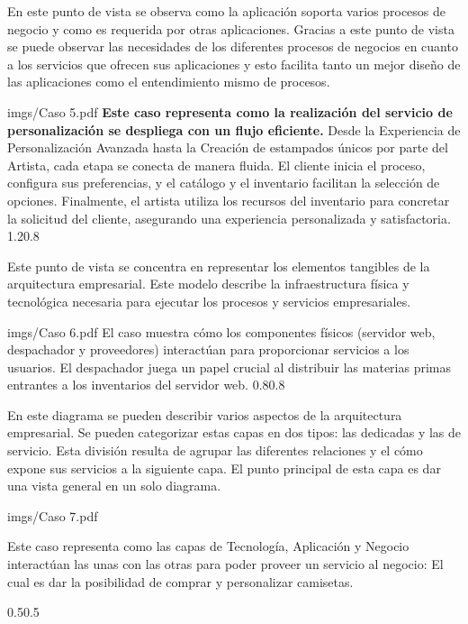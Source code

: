 {
 En este punto de vista se observa como la aplicación soporta varios procesos de negocio y como es requerida por otras aplicaciones. Gracias a este punto de vista se puede
observar las necesidades de los diferentes procesos de negocios en cuanto a los servicios que ofrecen sus aplicaciones y esto facilita tanto un mejor diseño de las aplicaciones como
el entendimiento mismo de procesos.\cite{definicion_capas}

}
{imgs/Caso 5.pdf}
{
   \textbf{Este caso representa como la realización del servicio de  personalización se despliega con un flujo eficiente.} Desde la Experiencia de Personalización Avanzada hasta la Creación de estampados únicos por parte del Artista, cada etapa se conecta de manera fluida. El cliente inicia el proceso, configura sus preferencias, y el catálogo y el inventario facilitan la selección de opciones. Finalmente, el artista utiliza los recursos del inventario para concretar la solicitud del cliente, asegurando una experiencia personalizada y satisfactoria. 
}{1.2}{0.8}


{
   Este punto de vista se concentra en representar los elementos tangibles de la arquitectura empresarial. Este modelo describe la infraestructura física y tecnológica necesaria para ejecutar los procesos y servicios empresariales.

}
{imgs/Caso 6.pdf}
{
   El caso muestra cómo los componentes físicos (servidor web, despachador y proveedores) interactúan para proporcionar servicios a los usuarios. El despachador juega un papel crucial al distribuir las materias primas entrantes a los inventarios del servidor web.
}{0.8}{0.8}

{
  En este diagrama se pueden describir varios aspectos de la arquitectura empresarial.
Se pueden categorizar estas capas en dos tipos: las dedicadas y las de servicio. Esta división resulta de agrupar las diferentes relaciones y el cómo expone sus servicios a la siguiente capa. El punto principal de esta capa es dar una vista general en un solo diagrama.\cite{definicion_capas}

}
{imgs/Caso 7.pdf}
{
   Este caso representa como las capas de Tecnología, Aplicación y Negocio interactúan las unas con las otras para poder proveer un servicio al negocio: El cual es dar la posibilidad de comprar y personalizar camisetas.
    
}{0.5}{0.5}
